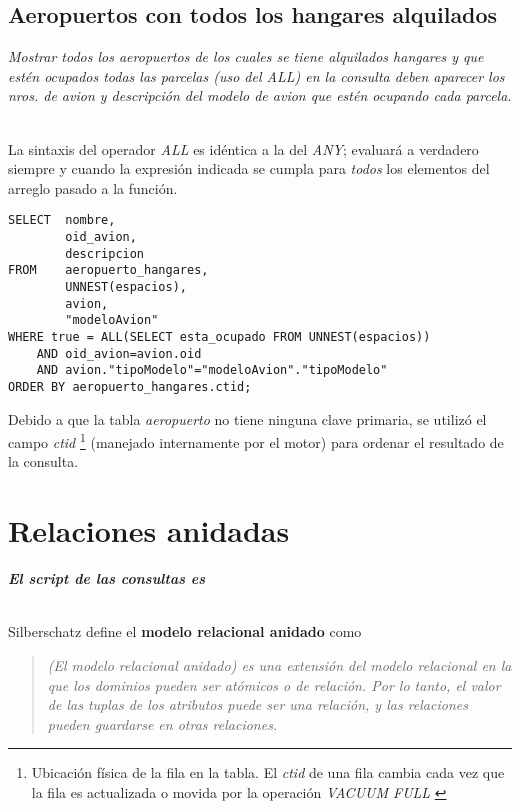 \subsection{Aeropuertos con todos los hangares alquilados}

\emph{Mostrar todos los aeropuertos de los cuales se tiene alquilados hangares y que estén ocupados todas las parcelas (uso del ALL) en la consulta deben aparecer los nros. de avion y descripción del modelo de avion que estén ocupando cada parcela.} 

~\\

La sintaxis del operador \emph{ALL} es idéntica a la del \emph{ANY}; evaluará a verdadero siempre y cuando la expresión indicada se cumpla para \emph{todos} los elementos del arreglo pasado a la función.   

\clearpage

\vspace*{5mm}
\lstset{style=sql}
\begin{lstlisting}
SELECT  nombre, 
        oid_avion, 
        descripcion 
FROM    aeropuerto_hangares, 
        UNNEST(espacios), 
        avion, 
        "modeloAvion" 
WHERE true = ALL(SELECT esta_ocupado FROM UNNEST(espacios)) 
    AND oid_avion=avion.oid 
    AND avion."tipoModelo"="modeloAvion"."tipoModelo" 
ORDER BY aeropuerto_hangares.ctid;
\end{lstlisting}

Debido a que la tabla \emph{aeropuerto} no tiene ninguna clave primaria, se utilizó el campo \emph{ctid} \footnote{Ubicación física de la fila en la tabla. El \emph{ctid} de una fila cambia cada vez que la fila es actualizada o movida por la operación \emph{VACUUM FULL} \cite{ctid}} (manejado internamente por el motor) para ordenar el resultado de la consulta. 


\section{Relaciones anidadas}
\emph{\textbf{El script de las consultas es }} 

~\\

Silberschatz define el \textbf{modelo relacional anidado} como
\begin{quote}\itshape
    (El modelo relacional anidado) es una extensión del modelo relacional en la que los dominios pueden ser atómicos o de relación. Por lo tanto, el valor de las tuplas de los atributos puede ser una relación, y las relaciones pueden guardarse en otras relaciones. \cite{silberschatz}
\end{quote}

